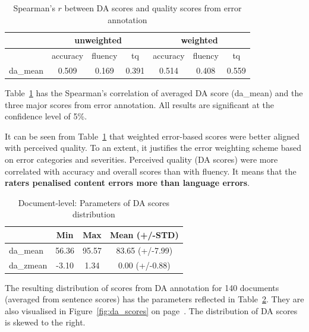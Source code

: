 \begin{table}[H]
	\centering
	\begin{tabular}{l|ccc|ccc}
		\toprule
				& \multicolumn{3}{c|}{unweighted} & \multicolumn{3}{c}{weighted} \\
		\midrule
		& accuracy   & fluency & tq    & accuracy & fluency & tq    \\
		\midrule
		da\_mean & 0.509      & 0.169   & 0.391 & 0.514    & 0.408   & 0.559 \\
		\bottomrule
	\end{tabular}
\caption{\label{tab:doc_err-da_corr}Spearman's $r$ between DA scores and quality scores from error annotation}
\end{table}

Table~\ref{tab:doc_err-da_corr} has the Spearman's correlation of averaged DA score (da\_mean) and the three major scores from error annotation. All results are significant at the confidence level of 5\%.

It can be seen from Table~\ref{tab:doc_err-da_corr} that weighted error-based scores were better aligned with perceived quality. To an extent, it justifies the error weighting scheme based on error categories and severities. Perceived quality (DA scores) were more correlated with accuracy and overall scores than with fluency. It means that the \textbf{raters penalised content errors more than language errors}. 

\begin{table}[H]
	\centering
	\begin{tabular}{l|ccc}
		\toprule
		& Min   & Max    & Mean (+/-STD)          \\
		\midrule
		da\_mean  & 56.36 & 95.57 & 83.65 (+/-7.99) \\
		da\_zmean & -3.10 & 1.34  & 0.00 (+/-0.88) \\
		\bottomrule
	\end{tabular}
	\caption{\label{tab:doc_da_dist}Document-level: Parameters of DA scores distribution}
\end{table}

The resulting distribution of scores from DA annotation for 140 documents (averaged from sentence scores) has the parameters reflected in Table~\ref{tab:doc_da_dist}. They are also visualised in Figure~\ref{fig:da_scores} on page~\pageref{pg:da_score_hists}. The distribution of DA scores is skewed to the right. 

